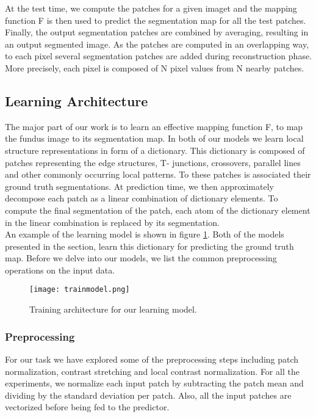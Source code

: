 At the test time, we compute the patches for a given imaget and the mapping function F is then used to predict the segmentation map for all the test patches. Finally, the output segmentation patches are combined by averaging, resulting in an output segmented image. As the patches are computed in an overlapping way, to each pixel several segmentation patches are added during reconstruction phase. More precisely, each pixel is composed of N pixel values from N nearby patches.\\

\subsection{Learning Architecture}
The major part of our work is to learn an effective mapping function F, to map the fundus image to its segmentation map. In both of our models we learn local structure representations in form of a dictionary. This dictionary is composed of patches representing the edge structures, T- junctions, crossovers, parallel lines and other commonly occurring local patterns. To these patches is associated their ground truth segmentations. At prediction time, we then approximately decompose each patch as a linear combination of dictionary elements. To compute the final segmentation of the patch, each atom of the dictionary element in the linear combination is replaced by its segmentation.\\

An example of the learning model is shown in figure \ref{fig:trainmodel}. Both of the models presented in the section, learn this dictionary for predicting the ground truth map.
Before we delve into our models, we list the common preprocessing operations on the input data.
\begin{figure}
	\centering	
	\texttt{[image: trainmodel.png]}
	\caption{Training architecture for our learning model.}
	\label{fig:trainmodel}		
\end{figure}
\subsubsection{Preprocessing}
For our task we have explored some of the preprocessing steps including patch normalization, contrast stretching and local contrast normalization. For all the experiments, we normalize each input patch by subtracting the patch mean and dividing by the standard deviation per patch. Also, all the input patches are vectorized before being fed to the predictor.


